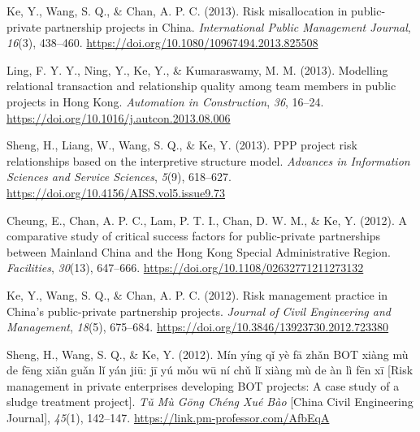 \documentclass[11pt,a4paper]{report} %
\begin{document}
\begin{tablist}
        \item[2013] \tab{}Ke, Y., Wang, S. Q., \& Chan, A. P. C. (2013). Risk misallocation in public-private partnership projects in China. \textit{International Public Management Journal}, \textit{16}(3), 438--460. \href{https://doi.org/10.1080/10967494.2013.825508}{https://doi.org/10.1080/10967494.2013.825508}
        
        \item[2013] \tab{}Ling, F. Y. Y., Ning, Y., Ke, Y., \& Kumaraswamy, M. M. (2013). Modelling relational transaction and relationship quality among team members in public projects in Hong Kong. \textit{Automation in Construction}, \textit{36}, 16--24. \href{https://doi.org/10.1016/j.autcon.2013.08.006}{https://doi.org/10.1016/j.autcon.2013.08.006}
        
        \item[2013] \tab{}Sheng, H., Liang, W., Wang, S. Q., \& Ke, Y. (2013). PPP project risk relationships based on the interpretive structure model. \textit{Advances in Information Sciences and Service Sciences}, \textit{5}(9), 618--627. \href{https://doi.org/10.4156/AISS.vol5.issue9.73}{https://doi.org/10.4156/AISS.vol5.issue9.73}
        
        \item[2012] \tab{}Cheung, E., Chan, A. P. C., Lam, P. T. I., Chan, D. W. M., \& Ke, Y. (2012). A comparative study of critical success factors for public-private partnerships between Mainland China and the Hong Kong Special Administrative Region. \textit{Facilities}, \textit{30}(13), 647--666. \href{https://doi.org/10.1108/02632771211273132}{https://doi.org/10.1108/02632771211273132}
        
        \item[2012] \tab{}Ke, Y., Wang, S. Q., \& Chan, A. P. C. (2012). Risk management practice in China's public-private partnership projects. \textit{Journal of Civil Engineering and Management}, \textit{18}(5), 675--684. \href{https://doi.org/10.3846/13923730.2012.723380}{https://doi.org/10.3846/13923730.2012.723380}
        
        \item[2012] \tab{}Sheng, H., Wang, S. Q., \& Ke, Y. (2012). Mín yíng qǐ yè fā zhǎn BOT xiàng mù de fēng xiǎn guǎn lǐ yán jiū: jī yú mǒu wū ní chǔ lǐ xiàng mù de àn lì fēn xī [Risk management in private enterprises developing BOT projects: A case study of a sludge treatment project]. \textit{Tǔ Mù Gōng Chéng Xué Bào} [China Civil Engineering Journal], \textit{45}(1), 142--147. \href{https://link.pm-professor.com/AfbEqA}{https://link.pm-professor.com/AfbEqA}
        

\end{tablist}
\end{document}
